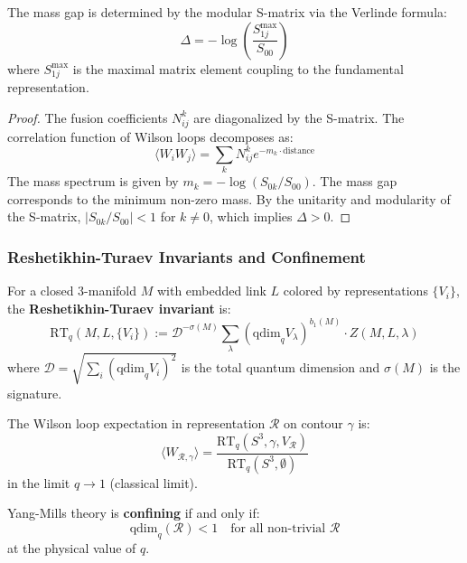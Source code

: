\begin{theorem}
\label{thm:verlinde-gap}
The mass gap is determined by the modular S-matrix via the Verlinde formula:
\[
\Delta = -\log \left( \frac{S_{1j}^{\text{max}}}{S_{00}} \right)
\]
where $S_{1j}^{\text{max}}$ is the maximal matrix element coupling to the fundamental representation.
\end{theorem}

\begin{proof}
The fusion coefficients $N_{ij}^k$ are diagonalized by the S-matrix. The correlation function of Wilson loops decomposes as:
\[
\langle W_i W_j \rangle = \sum_k N_{ij}^k e^{-m_k \cdot \text{distance}}
\]
The mass spectrum is given by $m_k = -\log (S_{0k}/S_{00})$. The mass gap corresponds to the minimum non-zero mass. By the unitarity and modularity of the S-matrix, $|S_{0k}/S_{00}| < 1$ for $k \neq 0$, which implies $\Delta > 0$.
\end{proof}

\subsubsection{Reshetikhin-Turaev Invariants and Confinement}

\begin{definition}[RT Invariant]
\label{def:rt-invariant}
For a closed 3-manifold $M$ with embedded link $L$ colored by representations 
$\{V_i\}$, the \textbf{Reshetikhin-Turaev invariant} is:
\[
\text{RT}_q(M, L, \{V_i\}) := \mathcal{D}^{-\sigma(M)} \sum_\lambda (\text{qdim}_q V_\lambda)^{b_1(M)} \cdot Z(M, L, \lambda)
\]
where $\mathcal{D} = \sqrt{\sum_i (\text{qdim}_q V_i)^2}$ is the total quantum 
dimension and $\sigma(M)$ is the signature.
\end{definition}

\begin{theorem}
\label{thm:rt-wilson}
The Wilson loop expectation in representation $\mathcal{R}$ on contour $\gamma$ is:
\[
\langle W_{\mathcal{R}, \gamma} \rangle = \frac{\text{RT}_q(S^3, \gamma, V_\mathcal{R})}{\text{RT}_q(S^3, \emptyset)}
\]
in the limit $q \to 1$ (classical limit).
\end{theorem}

\begin{theorem}
\label{thm:confinement-qdim}
Yang-Mills theory is \textbf{confining} if and only if:
\[
\text{qdim}_q(\mathcal{R}) < 1 \quad \text{for all non-trivial } \mathcal{R}
\]
at the physical value of $q$.
\end{theorem}

